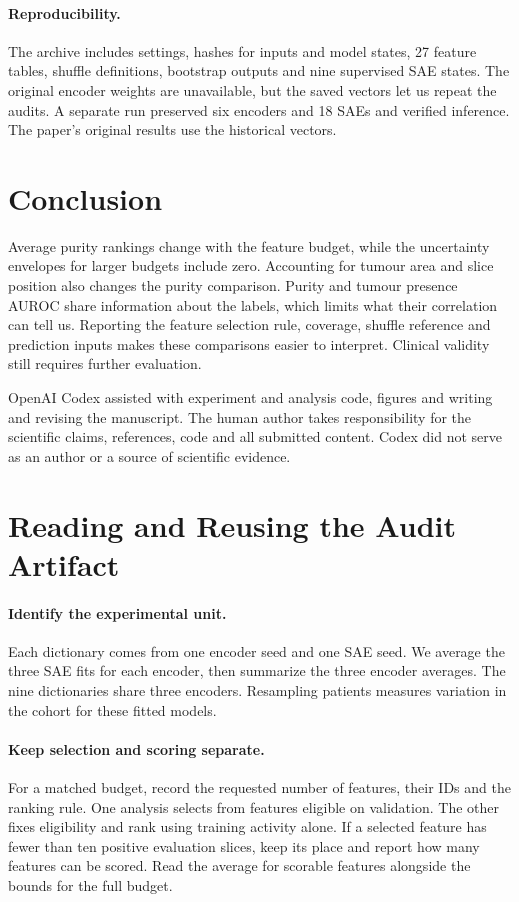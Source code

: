 \documentclass[letterpaper]{article}
\begin{document}
\paragraph{Reproducibility.}
The archive includes settings, hashes for inputs and model states, 27 feature tables, shuffle definitions, bootstrap outputs and nine supervised SAE states. The original encoder weights are unavailable, but the saved vectors let us repeat the audits. A separate run preserved six encoders and 18 SAEs and verified inference. The paper's original results use the historical vectors.

\section{Conclusion}
Average purity rankings change with the feature budget, while the uncertainty envelopes for larger budgets include zero. Accounting for tumour area and slice position also changes the purity comparison. Purity and tumour presence AUROC share information about the labels, which limits what their correlation can tell us. Reporting the feature selection rule, coverage, shuffle reference and prediction inputs makes these comparisons easier to interpret. Clinical validity still requires further evaluation.

OpenAI Codex assisted with experiment and analysis code, figures and writing and revising the manuscript. The human author takes responsibility for the scientific claims, references, code and all submitted content. Codex did not serve as an author or a source of scientific evidence.



\appendix
\setlength{\parskip}{0pt}
\section{Reading and Reusing the Audit Artifact}
\paragraph{Identify the experimental unit.}
Each dictionary comes from one encoder seed and one SAE seed. We average the three SAE fits for each encoder, then summarize the three encoder averages. The nine dictionaries share three encoders. Resampling patients measures variation in the cohort for these fitted models.

\paragraph{Keep selection and scoring separate.}
For a matched budget, record the requested number of features, their IDs and the ranking rule. One analysis selects from features eligible on validation. The other fixes eligibility and rank using training activity alone. If a selected feature has fewer than ten positive evaluation slices, keep its place and report how many features can be scored. Read the average for scorable features alongside the bounds for the full budget.
\end{document}
